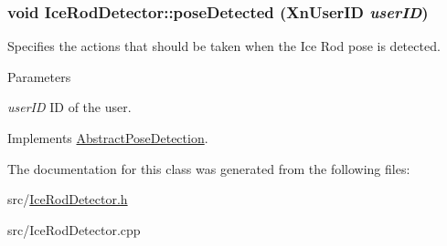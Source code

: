 \hypertarget{classIceRodDetector_aa2ef806316f44c93ea43f0b937c082fc}{
\subsubsection[{poseDetected}]{\setlength{\rightskip}{0pt plus 5cm}void IceRodDetector::poseDetected (XnUserID {\em userID})}}
\label{classIceRodDetector_aa2ef806316f44c93ea43f0b937c082fc}
Specifies the actions that should be taken when the Ice Rod pose is detected. 
\begin{DoxyParams}{Parameters}
\item[{\em userID}]ID of the user. \end{DoxyParams}


Implements \hyperlink{classAbstractPoseDetection_a7351e9ac500669934ff823aaf0767076}{AbstractPoseDetection}.



The documentation for this class was generated from the following files:\begin{DoxyCompactItemize}
\item 
src/\hyperlink{IceRodDetector_8h}{IceRodDetector.h}\item 
src/IceRodDetector.cpp\end{DoxyCompactItemize}
